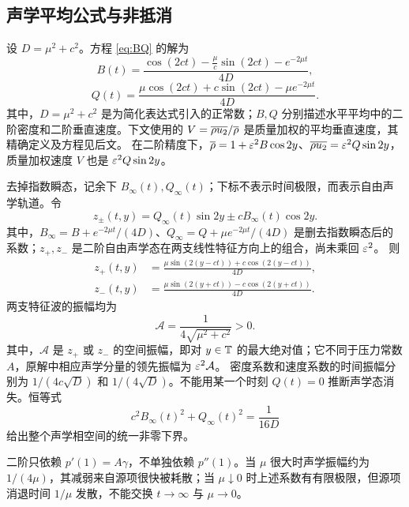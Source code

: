 \subsection{声学平均公式与非抵消}
设 $D=\mu^2+c^2$。方程 \eqref{eq:BQ} 的解为
\begin{equation}\label{eq:Bexplicit}
 \boxed{B(t)=\frac{\cos(2ct)-\frac\mu c\sin(2ct)-e^{-2\mu t}}{4D}},
\end{equation}
\begin{equation}\label{eq:Qexplicit}
 \boxed{Q(t)=\frac{\mu\cos(2ct)+c\sin(2ct)-\mu e^{-2\mu t}}{4D}}.
\end{equation}
其中，$D=\mu^2+c^2$ 是为简化表达式引入的正常数；$B,Q$ 分别描述水平平均中的二阶密度和二阶垂直速度。下文使用的 $V=\overline{\rho u_2}/\overline{\rho}$ 是质量加权的平均垂直速度，其精确定义及方程见后文。
在二阶精度下，$\overline{\rho}=1+\varepsilon^2B\cos2y$、$\overline{\rho u_2}=\varepsilon^2Q\sin2y$，质量加权速度 $V$ 也是 $\varepsilon^2Q\sin2y$。

去掉指数瞬态，记余下 $B_\infty(t),Q_\infty(t)$；下标不表示时间极限，而表示自由声学轨道。令
\[
 z_\pm(t,y)=Q_\infty(t)\sin2y\pm cB_\infty(t)\cos2y.
\]
其中，$B_\infty=B+e^{-2\mu t}/(4D)$、$Q_\infty=Q+\mu e^{-2\mu t}/(4D)$ 是删去指数瞬态后的系数；$z_+,z_-$ 是二阶自由声学态在两支线性特征方向上的组合，尚未乘回 $\varepsilon^2$。
则
\begin{align}
 z_+(t,y)&=\frac{\mu\sin(2(y-ct))+c\cos(2(y-ct))}{4D},\label{eq:zplus}\\
 z_-(t,y)&=\frac{\mu\sin(2(y+ct))-c\cos(2(y+ct))}{4D}.\label{eq:zminus}
\end{align}
两支特征波的振幅均为
\begin{equation}\label{eq:amplitude}
 \boxed{\mathcal A=\frac1{4\sqrt{\mu^2+c^2}}>0}.
\end{equation}
其中，$\mathcal A$ 是 $z_+$ 或 $z_-$ 的空间振幅，即对 $y\in\mathbb T$ 的最大绝对值；它不同于压力常数 $A$，原解中相应声学分量的领先振幅为 $\varepsilon^2\mathcal A$。
密度系数和速度系数的时间振幅分别为 $1/(4c\sqrt D)$ 和 $1/(4\sqrt D)$。不能用某一个时刻 $Q(t)=0$ 推断声学态消失。恒等式
\begin{equation}\label{eq:nonzero}
 c^2B_\infty(t)^2+Q_\infty(t)^2=\frac1{16D}
\end{equation}
给出整个声学相空间的统一非零下界。

二阶只依赖 $p'(1)=A\gamma$，不单独依赖 $p''(1)$。当 $\mu$ 很大时声学振幅约为 $1/(4\mu)$，其减弱来自源项很快被耗散；当 $\mu\downarrow0$ 时上述系数有有限极限，但源项消退时间 $1/\mu$ 发散，不能交换 $t\to\infty$ 与 $\mu\to0$。

